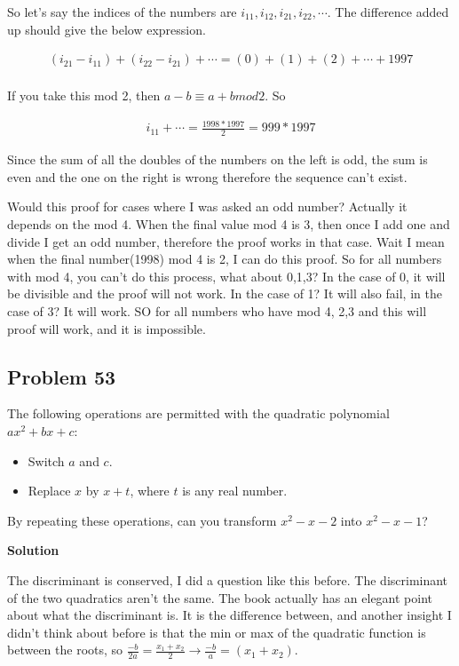 \documentclass[12pt,tikz,border=10pt]{article}
\theoremstyle{definition}
\theoremstyle{remark}
\begin{document}
So let's say the indices of the numbers are $i_{11},i_{12},i_{21},i_{22},\cdots$. The difference added up should give the below expression.

\begin{align*}
  (i_{21}-i_{11}) + (i_{22}-i_{21}) + \cdots = (0) + (1) + (2) + \cdots + 1997\\
\end{align*}

If you take this mod 2, then $a-b \equiv a+b mod 2$. So 

\begin{align*}
  i_{11} + \cdots = \frac{1998*1997}{2} = 999*1997
\end{align*}

Since the sum of all the doubles of the numbers on the left is odd, the sum is even and the one on the right is wrong therefore the 
sequence can't exist. 

Would this proof for cases where I was asked an odd number? Actually it depends on the mod 4. When the final value mod 4 is 3, then once I add one and divide
I get an odd number, therefore the proof works in that case. Wait I mean when the final number(1998) mod 4 is 2, I can do this proof. So for all numbers with 
mod 4, you can't do this process, what about 0,1,3? In the case of 0, it will be divisible and the proof will not work. In the case of 1? It will also fail, in the case of 3? It will work. SO for all numbers who have mod 4, 2,3 and this will proof will work, and it is impossible.

\subsection{Problem 53}


The following operations are permitted with the quadratic polynomial \( ax^2 + bx + c \):
\begin{itemize}
    \item[(a)] Switch \( a \) and \( c \).
    \item[(b)] Replace \( x \) by \( x + t \), where \( t \) is any real number.
\end{itemize}
By repeating these operations, can you transform \( x^2 - x - 2 \) into \( x^2 - x - 1 \)?

\textbf{Solution}

The discriminant is conserved, I did a question like this before. The discriminant of the two quadratics aren't the same.
The book actually has an elegant point about what the discriminant is. It is the difference between, and another insight I didn't 
think about before is that the min or max of the quadratic function is between the roots, so $\frac{-b}{2a}=\frac{x_1+x_2}{2} \rightarrow \frac{-b}{a}=(x_1+x_2)$.
\end{document}
